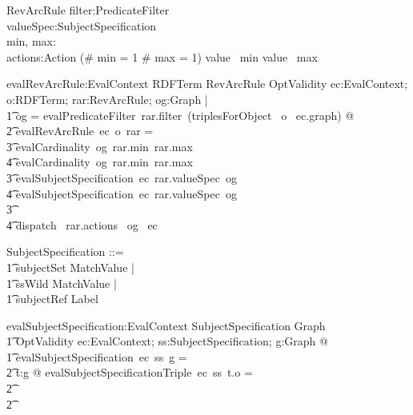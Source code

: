 \begin{schema}{RevArcRule}
   filter:PredicateFilter \\
   valueSpec:SubjectSpecification \\
   min, max:\optional[\nat] \\
   actions:\power Action
\where
   (\# min = 1 \land \# max = 1) \implies value~ min \leq value~ max
\end{schema}
		

\begin{gendef}
   evalRevArcRule:EvalContext \fun RDFTerm \fun RevArcRule \fun OptValidity
\where
  \forall ec:EvalContext; o:RDFTerm; rar:RevArcRule; og:Graph  | \\ 
\t1 og = evalPredicateFilter~rar.filter~(triplesForObject~ o~ ec.graph) @ \\
\t2		evalRevArcRule~ec~o~rar = \\
\t3 		\IF evalCardinality~og~rar.min~rar.max \neq \pass \\
\t4 			\THEN evalCardinality~og~rar.min~rar.max \\
\t3 		\ELSE \IF evalSubjectSpecification~ec~rar.valueSpec~og \neq \pass \\
\t4 			\THEN evalSubjectSpecification~ec~rar.valueSpec~og \\
\t3 		\ELSE \\
\t4 			 dispatch~ rar.actions~ og~ ec 
\end{gendef}
		

\begin{zed}
SubjectSpecification ::=  \\
\t1	subjectSet \ldata \power MatchValue \rdata | \\
\t1 ssWild \ldata \power MatchValue \rdata | \\
\t1 subjectRef \ldata Label \rdata
\end{zed}
			

\begin{gendef}
   evalSubjectSpecification:EvalContext \fun SubjectSpecification \fun Graph \fun \\
\t1 OptValidity
\where
   \forall ec:EvalContext; ss:SubjectSpecification; g:Graph @ \\ 
\t1	evalSubjectSpecification~ec~ss~g = \\
\t2 	\IF \forall t:g @ evalSubjectSpecificationTriple~ec~ss~t.o = \pass \\
\t2		\THEN \pass \\
\t2 	\ELSE \fail
\end{gendef}
			

